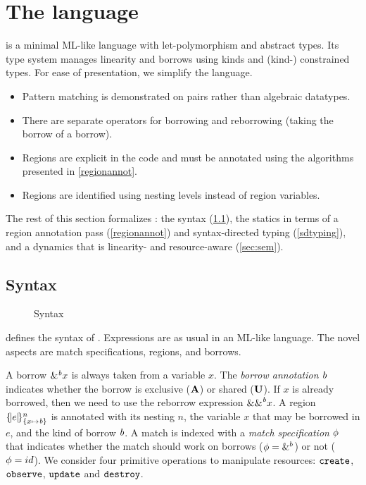 \section{The \lang language}

\lang is a minimal ML-like language with
let-polymorphism and abstract types. Its type system manages
linearity and borrows using kinds and (kind-) constrained types.
For ease of presentation, we simplify the language.
\begin{itemize}[topsep=0pt]
\item Pattern matching is demonstrated on pairs rather than algebraic
  datatypes.
\item There are separate operators for borrowing and reborrowing (taking
  the borrow of a borrow).
\item Regions are explicit in the code and must be annotated using the
  algorithms presented in \cref{regionannot}.
\item Regions are identified using nesting levels instead of region
  variables.
\end{itemize}

The rest of this section formalizes  \lang: the syntax (\cref{syntax}),
the statics in terms of a region annotation pass (\cref{regionannot}) and
syntax-directed typing (\cref{sdtyping}),
and a dynamics that is linearity- and resource-aware (\cref{sec:sem}).

\subsection{Syntax}
\label{syntax}

\begin{figure}[!tb]
  
  \vspace{-7pt}
  \caption{Syntax}
  \label{grammar}
  \vspace{-10pt}
\end{figure}


 defines the syntax of \lang. Expressions are as usual
in an ML-like language.  The novel aspects are match
specifications, regions, and borrows.

A borrow $\borrow{x}$ is always taken from a variable $x$. The
\emph{borrow annotation} $\BORROW$ indicates whether the borrow is exclusive
($\MBORROW$) or shared ($\IBORROW$). If $x$ is already borrowed,
then we need to use the reborrow expression $\reborrow{x}$.
%
A region $\region{\Sone x\BORROW}{e}$ is annotated with its nesting $n$, the variable $x$ that may be borrowed in $e$, and the kind of borrow $\BORROW$.
%
A match is indexed with a \emph{match specification} $\etransfm$ that indicates
whether the match should work on borrows ($\etransfm=\&^b$) or not ($\etransfm=id$).
%
We consider four primitive operations to manipulate resources:
$\create$, $\observe$, $\update$ and $\destroy$.

